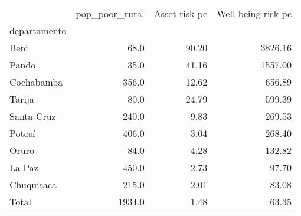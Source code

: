 \begin{tabular}{lrrr}
\toprule
{} &  pop\_poor\_rural &  Asset risk pc &  Well-being risk pc \\
departamento &                 &                &                     \\
\midrule
Beni         &            68.0 &          90.20 &             3826.16 \\
Pando        &            35.0 &          41.16 &             1557.00 \\
Cochabamba   &           356.0 &          12.62 &              656.89 \\
Tarija       &            80.0 &          24.79 &              599.39 \\
Santa Cruz   &           240.0 &           9.83 &              269.53 \\
Potosí       &           406.0 &           3.04 &              268.40 \\
Oruro        &            84.0 &           4.28 &              132.82 \\
La Paz       &           450.0 &           2.73 &               97.70 \\
Chuquisaca   &           215.0 &           2.01 &               83.08 \\
Total        &          1934.0 &           1.48 &               63.35 \\
\bottomrule
\end{tabular}
